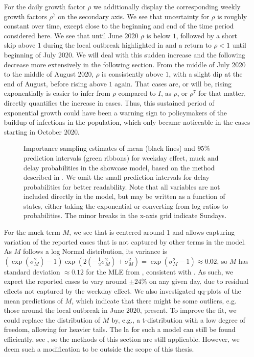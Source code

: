 For the daily growth factor $\rho$ we additionally display the corresponding weekly growth factors $\rho^{7}$ on the secondary axis. We see that uncertainty for $\rho$ is roughly constant over time, except close to the beginning and end of the time period considered here. We see that until June 2020 $\rho$ is below $1$, followed by a short skip above $1$ during the local outbreak highlighted in  and a return to $\rho < 1$ until beginning of July 2020. We will deal with this sudden increase and the following decrease more extensively in the following section. From the middle of July 2020 to the middle of August 2020, $\rho$ is consistently above $1$, with a slight dip at the end of August, before rising above $1$ again. That cases are, or will be, rising exponentially is easier to infer from $\rho$ compared to $I$, as $\rho$, or $\rho^7$ for that matter, directly quantifies the increase in cases. Thus, this sustained period of exponential growth could have been a warning sign to policymakers of the buildup of infections in the population, which only became noticeable in the cases starting in October 2020. 

\begin{figure}
    \resizebox{\textwidth}{!}{%
    }
    \caption{Importance sampling estimates of mean (black lines) and $95\%$ prediction intervals (green ribbons) for weekday effect, \glqq{}muck\grqq{} and delay probabilities in the showcase model, based on the method described in . We omit the small prediction intervals for delay probabilities for better readability. Note that all variables are not included directly in the model, but may be written as a function of states, either taking the exponential or converting from log-ratios to probabilities. The minor breaks in the x-axis grid indicate Sundays.} \label{fig:showcase_prediction_intervals}
\end{figure}

For the muck term $M$, we see that is centered around $1$ and allows capturing variation of the reported cases that is not captured by other terms in the model. As $M$ follows a log Normal distribution, its variance is $\left( \exp \left( \sigma^{2}_M \right) - 1 \right) \exp \left( 2 (- \frac{1}{2} \sigma^{2}_M) +\sigma^{2}_M \right) = \exp \left( \sigma^{2}_M - 1\right) \approx 0.02$, so $M$ has standard deviation $\approx 0.12$ for the MLE from , consistent with . As such, we expect the reported cases to vary around $\pm 24\%$ on any given day, due to residual effects not captured by the weekday effect. We also investigated qq-plots of the mean predictions of $M$, which indicate that there might be some outliers, e.g. those around the local outbreak in June 2020, present. To improve the fit, we could replace the distribution of $M$ by, e.g., a t-distribution with a low degree of freedom, allowing for heavier tails. The \acrshort{la} for such a model can still be found efficiently, see \citep[Section 11.7.2]{Durbin2012Time}, so the methods of this section are still applicable. However, we deem such a modification to be outside the scope of this thesis. 

